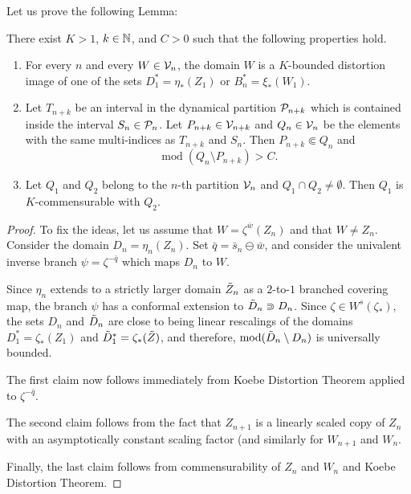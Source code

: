 \noindent
Let us prove the following Lemma:
\begin{lemma}
\label{lem-dyn-part}
There exist $K>1$, $k\in{\Bbb N}$,  and $C>0$ such that the following properties hold.
\begin{enumerate}
\item For every $n$ and every $W\in\mathcal{V}_n$, the domain $W$ is a $K$-bounded distortion image of one of the sets $D_1^*=\eta_*(Z_1)$ or $B_n^*=\xi_*(W_1)$.
\item Let $T_{n+k}$ be an interval in the dynamical partition $\mathcal{P}_{n+k}$ which is contained inside the interval  $S_n\in\mathcal{P}_n$.
Let $P_{n+k} \in \mathcal{V}_{n+k}$ and  $Q_n\in \mathcal{V}_n$ be the elements with the same multi-indices as $T_{n+k}$ and $S_n$. Then
$P_{n+k}\Subset Q_n$ and $$\operatorname{mod}(Q_n\setminus P_{n+k})>C.$$
\item Let $Q_1$ and $Q_2$ belong to the $n$-th partition $\mathcal{V}_n$ and $Q_1\cap Q_2\neq\emptyset$. Then $Q_1$ is $K$-commensurable with $Q_2$.
\end{enumerate}
\end{lemma}
\begin{proof}
To fix the ideas, let us assume that $W=\zeta^{\bar w}(Z_n)$ and that $W \neq Z_n$.  Consider the domain $D_n=\eta_n(Z_n)$.  Set $\bar q=\bar s_n \ominus \bar w$,  and consider the univalent  inverse branch $\psi=\zeta^{-\bar q}$ which maps $D_n$ to $W$. 

Since $\eta_n$ extends to a strictly larger domain $\tilde Z_n$ as a $2$-to-$1$ branched covering map, the branch $\psi$ has a conformal extension to $\tilde D_n \Supset D_n$. Since $\zeta \in W^s(\zeta_*)$, the sets $D_n$ and $\tilde D_n$ are close to being linear rescalings of the domains $D_1^*=\zeta_*(Z_1)$ and $\tilde D_1^*=\zeta_*(\tilde Z)$, and therefore,  $\operatorname{mod}(\tilde D_n \setminus  D_n)$ is universally  bounded. 

The first claim now follows immediately from Koebe Distortion Theorem applied to $\zeta^{-\bar q}$. 

The second claim follows from the fact that $Z_{n+1}$ is a linearly scaled copy of $Z_n$ with an asymptotically constant scaling factor (and similarly for $W_{n+1}$ and $W_n$. 



Finally, the last claim follows from  commensurability of $Z_n$ and $W_n$ and Koebe Distortion Theorem.
\end{proof}

